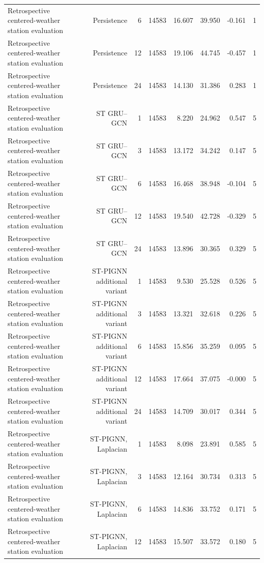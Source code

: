 \begin{table}[t]
\begin{tabular}{lrrrrrrr}
Retrospective centered-weather station evaluation & Persistence & 6 & 14583 & 16.607 & 39.950 & -0.161 & 1 \\
Retrospective centered-weather station evaluation & Persistence & 12 & 14583 & 19.106 & 44.745 & -0.457 & 1 \\
Retrospective centered-weather station evaluation & Persistence & 24 & 14583 & 14.130 & 31.386 & 0.283 & 1 \\
Retrospective centered-weather station evaluation & ST GRU–GCN & 1 & 14583 & 8.220 & 24.962 & 0.547 & 5 \\
Retrospective centered-weather station evaluation & ST GRU–GCN & 3 & 14583 & 13.172 & 34.242 & 0.147 & 5 \\
Retrospective centered-weather station evaluation & ST GRU–GCN & 6 & 14583 & 16.468 & 38.948 & -0.104 & 5 \\
Retrospective centered-weather station evaluation & ST GRU–GCN & 12 & 14583 & 19.540 & 42.728 & -0.329 & 5 \\
Retrospective centered-weather station evaluation & ST GRU–GCN & 24 & 14583 & 13.896 & 30.365 & 0.329 & 5 \\
Retrospective centered-weather station evaluation & ST-PIGNN additional variant & 1 & 14583 & 9.530 & 25.528 & 0.526 & 5 \\
Retrospective centered-weather station evaluation & ST-PIGNN additional variant & 3 & 14583 & 13.321 & 32.618 & 0.226 & 5 \\
Retrospective centered-weather station evaluation & ST-PIGNN additional variant & 6 & 14583 & 15.856 & 35.259 & 0.095 & 5 \\
Retrospective centered-weather station evaluation & ST-PIGNN additional variant & 12 & 14583 & 17.664 & 37.075 & -0.000 & 5 \\
Retrospective centered-weather station evaluation & ST-PIGNN additional variant & 24 & 14583 & 14.709 & 30.017 & 0.344 & 5 \\
Retrospective centered-weather station evaluation & ST-PIGNN, Laplacian & 1 & 14583 & 8.098 & 23.891 & 0.585 & 5 \\
Retrospective centered-weather station evaluation & ST-PIGNN, Laplacian & 3 & 14583 & 12.164 & 30.734 & 0.313 & 5 \\
Retrospective centered-weather station evaluation & ST-PIGNN, Laplacian & 6 & 14583 & 14.836 & 33.752 & 0.171 & 5 \\
Retrospective centered-weather station evaluation & ST-PIGNN, Laplacian & 12 & 14583 & 15.507 & 33.572 & 0.180 & 5 \\

\end{tabular}
\end{table}
